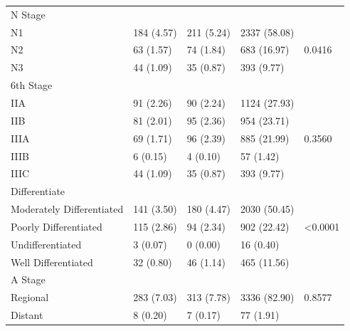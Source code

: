 \documentclass[times,sort&compress,3p]{elsarticle}
\theoremstyle{plain}
\theoremstyle{definition}
\begin{document}
\begin{table}[H]
\begin{tabular}{lllll}
N Stage                   &              &                &                &                    \\
N1                        & 184 (4.57)   & 211 (5.24)     & 2337 (58.08)   &                    \\
N2                        & 63 (1.57)    & 74 (1.84)      & 683 (16.97)    & 0.0416             \\
N3                        & 44 (1.09)    & 35 (0.87)      & 393 (9.77)     &                    \\ \hline
6th Stage                 &              &                &                &                    \\
IIA                       & 91 (2.26)    & 90 (2.24)      & 1124 (27.93)   &                    \\
IIB                       & 81 (2.01)    & 95 (2.36)      & 954 (23.71)    &                    \\
IIIA                      & 69 (1.71)    & 96 (2.39)      & 885 (21.99)    & 0.3560             \\
IIIB                      & 6 (0.15)     & 4 (0.10)       & 57 (1.42)      &                    \\
IIIC                      & 44 (1.09)    & 35 (0.87)      & 393 (9.77)     &                    \\ \hline
Differentiate             &              &                &                &                    \\
Moderately Differentiated & 141 (3.50)   & 180 (4.47)     & 2030 (50.45)   &                    \\
Poorly Differentiated     & 115 (2.86)   & 94 (2.34)      & 902 (22.42)    & \textless 0.0001   \\
Undifferentiated          & 3 (0.07)     & 0 (0.00)       & 16 (0.40)      &                    \\
Well Differentiated       & 32 (0.80)    & 46 (1.14)      & 465 (11.56)    &                    \\ \hline
A Stage                   &              &                &                &                    \\
Regional                  & 283 (7.03)   & 313 (7.78)     & 3336 (82.90)   & 0.8577             \\
Distant                   & 8 (0.20)     & 7 (0.17)       & 77 (1.91)      &                    \\ \hline


\end{tabular}
\end{table}
\end{document}
